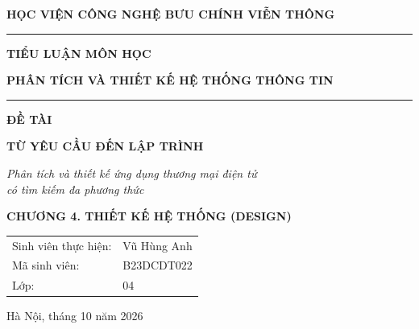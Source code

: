 \documentclass[12pt,a4paper]{article}
\begin{document}
\begin{titlepage}
\centering
{}
{\large\bfseries HỌC VIỆN CÔNG NGHỆ BƯU CHÍNH VIỄN THÔNG\par}
\vspace{2pt}\rule{0.35\linewidth}{0.6pt}\par
\vspace{2.6cm}
{\Large\bfseries TIỂU LUẬN MÔN HỌC\par}
\vspace{0.25cm}
{\Large\bfseries PHÂN TÍCH VÀ THIẾT KẾ HỆ THỐNG THÔNG TIN\par}
\vspace{0.9cm}
\rule{0.55\linewidth}{0.6pt}\par
\vspace{0.9cm}
{\large\bfseries ĐỀ TÀI\par}
\vspace{0.4cm}
{\LARGE\bfseries TỪ YÊU CẦU ĐẾN LẬP TRÌNH\par}
\vspace{0.3cm}
{\large\itshape Phân tích và thiết kế ứng dụng thương mại điện tử\\ có tìm kiếm đa phương thức\par}
\vspace{1.4cm}
{\Large\bfseries CHƯƠNG 4. THIẾT KẾ HỆ THỐNG (DESIGN)\par}
\vspace{2.4cm}
{\large
\begin{tabular}{@{}ll@{}}
Sinh viên thực hiện: & Vũ Hùng Anh\\[0.25cm]
Mã sinh viên: & B23DCDT022\\[0.25cm]
Lớp: & 04
\end{tabular}\par}
\vfill
{\large Hà Nội, tháng 10 năm 2026\par}
\vspace{0.6cm}
\end{titlepage}

{\setlength{\parskip}{0pt}\tableofcontents}
\clearpage
{\setlength{\parskip}{0pt}\listoffigures\vspace{0.6cm}\listoftables}
\clearpage
\end{document}
